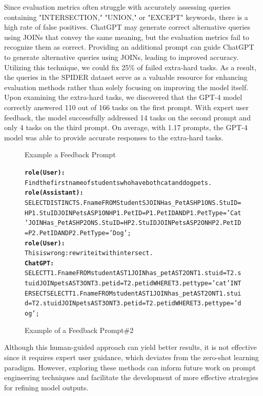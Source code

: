 Since evaluation metrics often struggle with accurately assessing queries containing "INTERSECTION," "UNION," or "EXCEPT" keywords, there is a high rate of false positives. ChatGPT may generate correct alternative queries using JOINs that convey the same meaning, but the evaluation metrics fail to recognize them as correct. Providing an additional prompt can guide ChatGPT to generate alternative queries using JOINs, leading to improved accuracy. Utilizing this technique, we could fix 25\% of failed extra-hard tasks. As a result, the queries in the SPIDER dataset serve as a valuable resource for enhancing evaluation methods rather than solely focusing on improving the model itself.
Upon examining the extra-hard tasks, we discovered that the GPT-4 model correctly answered 110 out of 166 tasks on the first prompt. With expert user feedback, the model successfully addressed 14 tasks on the second prompt and only 4 tasks on the third prompt. On average, with 1.17 prompts, the GPT-4 model was able to provide accurate responses to the extra-hard tasks.

\begin{figure}[H]
    \begin{AIbox}{Example a Feedback Prompt}
        \vspace{-10px}
        \parbox{1\textwidth}{\scriptsize
        \begin{alltt} \larger
            {\bf role(User):} \\
            Find the first name of students who have both cat and dog pets.
            \\
            {\bf role(Assistant):} \\
            SELECT DISTINCT S.Fname FROM Student S JOIN Has\_Pet AS HP1 ON S.StuID = HP1.StuID JOIN Pets AS P1 ON HP1.PetID = P1.PetID AND P1.PetType = 'Cat' JOIN Has\_Pet AS HP2 ON S.StuID = HP2.StuID JOIN Pets AS P2 ON HP2.PetID = P2.PetID AND P2.PetType = 'Dog';
            \\
            {\bf role(User):} \\
            This is wrong: rewrite it with intersect.
            \\
            {\bf ChatGPT:} \\
            SELECT T1.Fname FROM student AS T1 JOIN has\_pet AS T2 ON T1.stuid  =  T2.stuid JOIN pets AS T3 ON T3.petid  =  T2.petid WHERE T3.pettype  =  'cat' INTERSECT SELECT T1.Fname FROM student AS T1 JOIN has\_pet AS T2 ON T1.stuid  =  T2.stuid JOIN pets AS T3 ON T3.petid  =  T2.petid WHERE T3.pettype  =  'dog';
        \end{alltt}
        }
        \vspace{-10px}
    \end{AIbox}
    
    \caption{Example of a Feedback Prompt\#2}
\end{figure}

Although this human-guided approach can yield better results, it is not effective since it requires expert user guidance, which deviates from the zero-shot learning paradigm. However, exploring these methods can inform future work on prompt engineering techniques and facilitate the development of more effective strategies for refining model outputs.